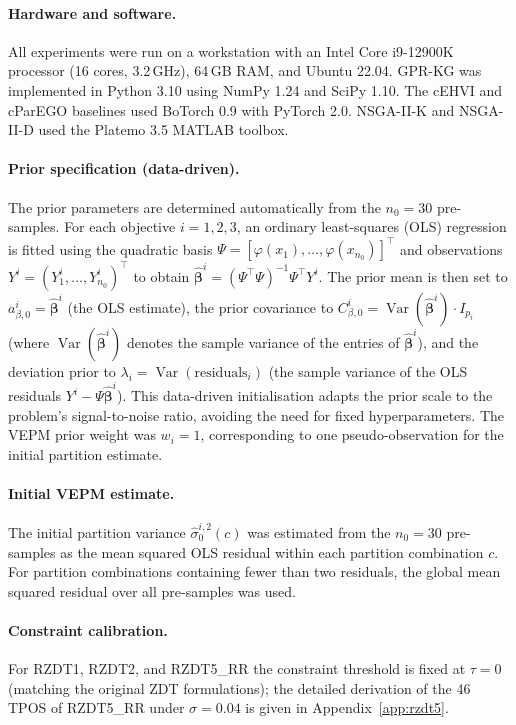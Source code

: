 \documentclass[12pt]{article}
\theoremstyle{plain}
\theoremstyle{definition}
\theoremstyle{remark}
\DeclareMathOperator{\Var}{Var}
\begin{document}
\paragraph{Hardware and software.}
All experiments were run on a workstation with an Intel Core i9-12900K
processor (16 cores, 3.2\,GHz), 64\,GB RAM, and Ubuntu 22.04.
GPR-KG was implemented in Python 3.10 using NumPy 1.24 and SciPy 1.10.
The cEHVI and cParEGO baselines used BoTorch 0.9 with PyTorch 2.0.
NSGA-II-K and NSGA-II-D used the Platemo 3.5 MATLAB toolbox.

\paragraph{Prior specification (data-driven).}
The prior parameters are determined automatically from the $n_0=30$
pre-samples.  For each objective $i=1,2,3$, an ordinary least-squares
(OLS) regression is fitted using the quadratic basis
$\Psi=[\varphi(x_1),\ldots,\varphi(x_{n_0})]^\top$ and observations
$Y^i=(Y^i_1,\ldots,Y^i_{n_0})^\top$ to obtain
$\hat{\boldsymbol{\beta}}^i=(\Psi^\top\Psi)^{-1}\Psi^\top Y^i$.
The prior mean is then set to $a^i_{\beta,0}=\hat{\boldsymbol{\beta}}^i$
(the OLS estimate), the prior covariance to
$C^i_{\beta,0}=\Var(\hat{\boldsymbol{\beta}}^i)\cdot I_{p_i}$
(where $\Var(\hat{\boldsymbol{\beta}}^i)$ denotes the sample variance
of the entries of $\hat{\boldsymbol{\beta}}^i$), and the deviation prior
to $\lambda_i=\Var(\text{residuals}_i)$ (the sample variance of the
OLS residuals $Y^i-\Psi\hat{\boldsymbol{\beta}}^i$).  This data-driven
initialisation adapts the prior scale to the problem's signal-to-noise
ratio, avoiding the need for fixed hyperparameters.
The VEPM prior weight was $w_i = 1$, corresponding to one
pseudo-observation for the initial partition estimate.

\paragraph{Initial VEPM estimate.}
The initial partition variance $\hat{\sigma}^{i,2}_0(c)$ was estimated from
the $n_0 = 30$ pre-samples as the mean squared OLS residual within each
partition combination $c$.  For partition combinations containing fewer
than two residuals, the global mean squared residual over all pre-samples
was used.

\paragraph{Constraint calibration.}
For RZDT1, RZDT2, and RZDT5\_RR the constraint threshold is fixed at
$\tau = 0$ (matching the original ZDT formulations); the detailed
derivation of the 46 TPOS of RZDT5\_RR under $\sigma=0.04$ is given
in Appendix~\ref{app:rzdt5}.
\end{document}
